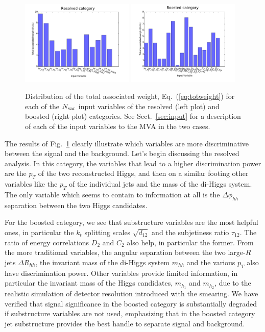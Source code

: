\begin{figure}[t]
\begin{center}
\includegraphics[width=0.48\textwidth]{plots/res_wgthist.pdf}
\includegraphics[width=0.48\textwidth]{plots/boosted_wgthist.pdf}
\caption{\small
Distribution of the total associated weight,
Eq.~(\ref{eq:totweight}) for each of the $N_{\rm var}$ input
variables of the resolved (left plot) and boosted (right plot) categories.
%
See Sect.~\ref{sec:input} for a description of each of the input
variables to the MVA in the two cases.
}
\label{fig:nnweights}
\end{center}
\end{figure}

The results of Fig.~\ref{fig:nnweights} clearly illustrate which variables
are more discriminative between the signal and the background.
%
Let's begin discussing the resolved analysis.
%
In this category, the variables that lead to
a higher discrimination power
are the $p_T$ of the two reconstructed Higgs, and then on a similar
footing other variables like the $p_T$ of the individual jets
and the mass of the di-Higgs system.
%
The only variable which seems to contain to information at all
is the $\Delta \phi_{hh}$ separation between the two
Higgs candidates.


For the boosted category, we see that substructure variables
are the most helpful ones, in particular the $k_t$ splitting scales
$\sqrt{d_{12}}$ and the subjetiness ratio $\tau_{12}$.
%
The ratio of energy correlations $D_2$ and $C_2$ also help,
in particular the former.
%
From the more traditional variables, the angular
separation between the two large-$R$ jets $\Delta R_{hh}$,
the invariant mass of the di-Higgs system $m_{hh}$ and the various
$p_T$ also have discrimination power.
%
Other variables provide limited information, in particular the invariant
mass of the Higgs candidates, $m_{h_1}$ and $m_{h_2}$, due to the realistic
simulation of detector resolution introduced with the smearing.
%
We have verified that signal significance in the boosted category is substantially
degraded if substructure variables are not used, emphasizing that
in the boosted category jet substructure provides the best handle
to separate signal and background.

